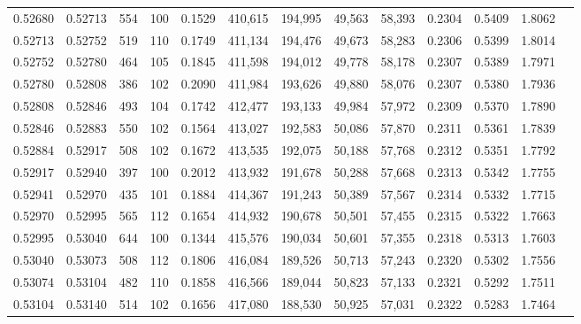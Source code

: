 \begin{tabular}{rrrrrrrrrrrrr}
0.52680 & 0.52713 &   554 & 100 &                                     0.1529 & 410,615 & 194,995 &  49,563 &  58,393 & 0.2304 & 0.5409 & 1.8062 \\
0.52713 & 0.52752 &   519 & 110 &                                     0.1749 & 411,134 & 194,476 &  49,673 &  58,283 & 0.2306 & 0.5399 & 1.8014 \\
0.52752 & 0.52780 &   464 & 105 &                                     0.1845 & 411,598 & 194,012 &  49,778 &  58,178 & 0.2307 & 0.5389 & 1.7971 \\
0.52780 & 0.52808 &   386 & 102 &                                     0.2090 & 411,984 & 193,626 &  49,880 &  58,076 & 0.2307 & 0.5380 & 1.7936 \\
0.52808 & 0.52846 &   493 & 104 &                                     0.1742 & 412,477 & 193,133 &  49,984 &  57,972 & 0.2309 & 0.5370 & 1.7890 \\
0.52846 & 0.52883 &   550 & 102 &                                     0.1564 & 413,027 & 192,583 &  50,086 &  57,870 & 0.2311 & 0.5361 & 1.7839 \\
0.52884 & 0.52917 &   508 & 102 &                                     0.1672 & 413,535 & 192,075 &  50,188 &  57,768 & 0.2312 & 0.5351 & 1.7792 \\
0.52917 & 0.52940 &   397 & 100 &                                     0.2012 & 413,932 & 191,678 &  50,288 &  57,668 & 0.2313 & 0.5342 & 1.7755 \\
0.52941 & 0.52970 &   435 & 101 &                                     0.1884 & 414,367 & 191,243 &  50,389 &  57,567 & 0.2314 & 0.5332 & 1.7715 \\
0.52970 & 0.52995 &   565 & 112 &                                     0.1654 & 414,932 & 190,678 &  50,501 &  57,455 & 0.2315 & 0.5322 & 1.7663 \\
0.52995 & 0.53040 &   644 & 100 &                                     0.1344 & 415,576 & 190,034 &  50,601 &  57,355 & 0.2318 & 0.5313 & 1.7603 \\
0.53040 & 0.53073 &   508 & 112 &                                     0.1806 & 416,084 & 189,526 &  50,713 &  57,243 & 0.2320 & 0.5302 & 1.7556 \\
0.53074 & 0.53104 &   482 & 110 &                                     0.1858 & 416,566 & 189,044 &  50,823 &  57,133 & 0.2321 & 0.5292 & 1.7511 \\
0.53104 & 0.53140 &   514 & 102 &                                     0.1656 & 417,080 & 188,530 &  50,925 &  57,031 & 0.2322 & 0.5283 & 1.7464 \\

\end{tabular}
